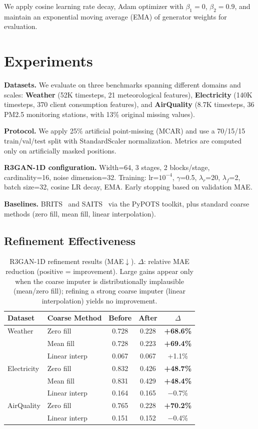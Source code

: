 \documentclass[sigconf,nonacm]{acmart}
\begin{document}
We apply cosine learning rate decay, Adam optimizer with $\beta_1 = 0$, $\beta_2 = 0.9$, and maintain an exponential moving average (EMA) of generator weights for evaluation.

\section{Experiments}

\textbf{Datasets.}
We evaluate on three benchmarks spanning different domains and scales: \textbf{Weather} (52K timesteps, 21 meteorological features), \textbf{Electricity} (140K timesteps, 370 client consumption features), and \textbf{AirQuality} (8.7K timesteps, 36 PM2.5 monitoring stations, with 13\% original missing values).

\textbf{Protocol.}
We apply 25\% artificial point-missing (MCAR) and use a 70/15/15 train/val/test split with StandardScaler normalization. Metrics are computed only on artificially masked positions.

\textbf{R3GAN-1D configuration.}
Width=64, 3 stages, 2 blocks/stage, cardinality=16, noise dimension=32. Training: lr=$10^{-4}$, $\gamma$=0.5, $\lambda_r$=20, $\lambda_f$=2, batch size=32, cosine LR decay, EMA. Early stopping based on validation MAE.

\textbf{Baselines.}
BRITS~\citep{cao2018brits} and SAITS~\citep{du2023saits} via the PyPOTS toolkit, plus standard coarse methods (zero fill, mean fill, linear interpolation).

\subsection{Refinement Effectiveness}

\begin{table}[t]
\centering
\caption{R3GAN-1D refinement results (MAE$\downarrow$). $\Delta$: relative MAE reduction (positive = improvement). Large gains appear only when the coarse imputer is distributionally implausible (mean/zero fill); refining a strong coarse imputer (linear interpolation) yields no improvement.}
\label{tab:refinement}
\small
\begin{tabular}{@{}llccc@{}}
\toprule
Dataset & Coarse Method & Before & After & $\Delta$ \\
\midrule
Weather & Zero fill & 0.728 & 0.228 & \textbf{+68.6\%} \\
        & Mean fill & 0.728 & 0.223 & \textbf{+69.4\%} \\
        & Linear interp & 0.067 & 0.067 & +1.1\% \\
\midrule
Electricity & Zero fill & 0.832 & 0.426 & \textbf{+48.7\%} \\
            & Mean fill & 0.831 & 0.429 & \textbf{+48.4\%} \\
            & Linear interp & 0.164 & 0.165 & $-$0.7\% \\
\midrule
AirQuality & Zero fill & 0.765 & 0.228 & \textbf{+70.2\%} \\
           & Linear interp & 0.151 & 0.152 & $-$0.4\% \\
\bottomrule
\end{tabular}
\end{table}
\end{document}
